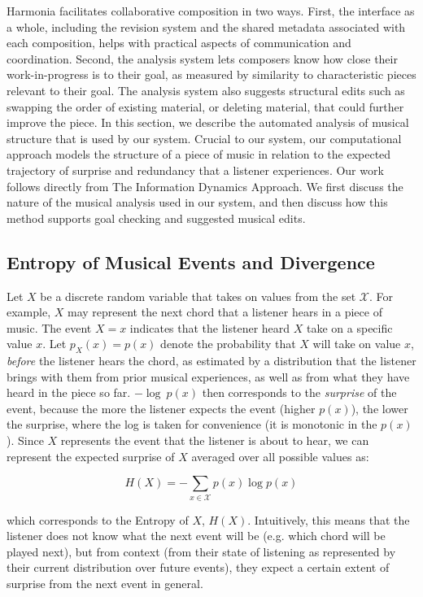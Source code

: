 \documentclass[final,authoryear,5p,times,twocolumn]{elsarticle}
\begin{document}
Harmonia facilitates collaborative composition in two ways. First, the interface as a whole, including the revision system and the shared metadata associated with each composition, helps with practical aspects of communication and coordination. Second, the analysis system lets composers know how close their work-in-progress is to their goal, as measured by similarity to characteristic pieces relevant to their goal. The analysis system also suggests structural edits such as swapping the order of existing material, or deleting material, that could further improve the piece. In this section, we describe the automated analysis of musical structure that is used by our system. Crucial to our system, our computational approach models the structure of a piece of music in relation to the expected trajectory of surprise and redundancy that a listener experiences. Our work follows directly from The Information Dynamics Approach. \citep{abdallah2012cognitive} We first discuss the nature of the musical analysis used in our system, and then discuss how this method supports goal checking and suggested musical edits.

\subsection{Entropy of Musical Events and Divergence}
 
Let $X$ be a discrete random variable that takes on values from the set $\mathcal{X}$. For example, $X$ may represent the next chord that a listener hears in a piece of music. The event $X=x$ indicates that the listener heard $X$ take on a specific value $x$. Let $p_X(x) = p(x)$ denote the probability that $X$ will take on value $x$, \textit{before} the listener hears the chord, as estimated by a distribution that the listener brings with them from prior musical experiences, as well as from what they have heard in the piece so far. $-\log\ p(x)$ then corresponds to the \textit{surprise} of the event, because the more the listener expects the event (higher $p(x)$), the lower the surprise, where the log is taken for convenience (it is monotonic in the $p(x)$). Since $X$ represents the event that the listener is about to hear, we can represent the expected surprise of $X$ averaged over all possible values as:
 
 $$ H(X) = - \sum_{x \in \mathcal{X}} p(x) \log p(x)$$
 
\noindent which corresponds to the Entropy of $X$, $H(X)$. Intuitively, this means that the listener does not know what the next event will be (e.g. which chord will be played next), but from context (from their state of listening as represented by their current distribution over future events), they expect a certain extent of surprise from the next event in general.
\end{document}
